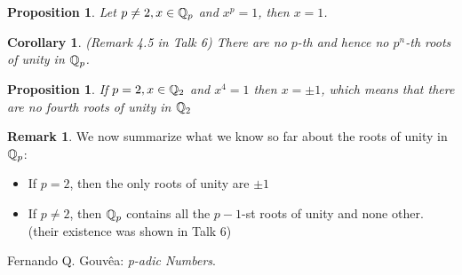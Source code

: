 \documentclass{article}
\theoremstyle{plain}
\newtheorem{prop}[thm]{Proposition}
\newtheorem{Cor}[thm]{Corollary}
\theoremstyle{definition}
\newtheorem{rem}[thm]{Remark}
\begin{document}
	\begin{minipage}[t]{0.45\textwidth}
		\begin{prop}
		Let $p \neq 2, x \in \Bbb Q_{p}$ and $x^{p}=1$, then $x=1$.
		\end{prop}
		\begin{Cor}
		(Remark 4.5 in Talk 6) There are no $p$-th and hence no $p^{n}$-th roots of unity in $\Bbb Q_{p}$.
		\end{Cor}
		\begin{prop} If $p = 2, x \in \Bbb Q_{2}$ and $x^{4} = 1$ then $x = \pm 1$, which means that there are no fourth roots of unity in $\Bbb Q_{2}$
		\end{prop}
		\begin{rem}
		We now summarize what we know so far about the roots of unity in $\Bbb Q_{p}$:
		\begin{itemize}
			\item If $p=2$, then the only roots of unity are $\pm 1$
			\item If $p \neq 2$, then $\Bbb Q_{p}$ contains all the $p-1$-st roots of unity and none other. (their existence was shown in Talk 6)
		\end{itemize}

		\end{rem}
		\begin{thebibliography}{widest-label} %

			Fernando Q. Gouv\^{e}a:
			\emph{p-adic Numbers}.


		\end{thebibliography}
	\end{minipage}
\end{document}
